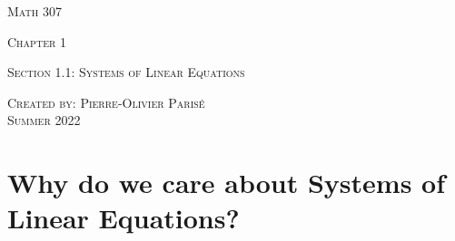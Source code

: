 \documentclass[12pt,a4paper]{article}
\begin{document}
\thispagestyle{empty}

\begin{center}
\vspace*{2.5cm}

{\Huge \textsc{Math 307}}

\vspace*{2cm}

{\LARGE \textsc{Chapter 1}} 

\vspace*{0.75cm}

\noindent\textsc{Section 1.1: Systems of Linear Equations}

\vspace*{0.75cm}

\tableofcontents

\vfill

\noindent \textsc{Created by: Pierre-Olivier Paris{\'e}} \\
\textsc{Summer 2022}
\end{center}

\newpage

\section{Why do we care about Systems of Linear Equations?}
\end{document}
